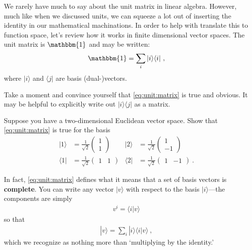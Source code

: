 We rarely have much to say about the unit matrix in linear algebra. However, much like when we discussed units, we can squeeze a lot out of inserting the identity in our mathematical machinations. In order to help with translate this to function space, let's review how it works in finite dimensional vector spaces. The unit matrix is $\mathbbm{1}$ and may be written:
\begin{align}
  \mathbbm{1} = \sum_i |i\rangle\langle i| \ ,
  \label{eq:unit:matrix}
\end{align}
where $|i\rangle$ and $\langle j|$ are basis (dual-)vectors. 
\begin{exercise}
Take a moment and convince yourself that \eqref{eq:unit:matrix} is true and obvious. It may be helpful to explicitly write out $|i\rangle \langle j|$ as a matrix. 
\end{exercise}
\begin{exercise}\label{ex:completeness:for:non:cartesian:basis}
Suppose you have a two-dimensional Euclidean vector space. Show that \eqref{eq:unit:matrix} is true for the basis
\begin{align}
  |1 \rangle &= 
  \frac{1}{\sqrt{2}}
  \begin{pmatrix}
  1 \\ 1
  \end{pmatrix}
  &
  |2 \rangle &= 
  \frac{1}{\sqrt{2}}
  \begin{pmatrix}
  1 \\ -1
  \end{pmatrix}
  \\
  \langle 1 | &= 
  \frac{1}{\sqrt{2}}
  \begin{pmatrix}
  1 & 1
  \end{pmatrix}
  &
  \langle 2 | &= 
  \frac{1}{\sqrt{2}}
  \begin{pmatrix}
  1 & -1
  \end{pmatrix} \ .
\end{align}
\end{exercise}
In fact, \eqref{eq:unit:matrix} defines what it means that a set of basis vectors is \textbf{complete}. You can write any vector $|v\rangle$ with respect to the basis $|i\rangle$---the components are simply
\begin{align}
  v^i = \langle i | v \rangle
\end{align}
so that 
\begin{align}
  |v\rangle = \sum_i |i\rangle \langle i | v \rangle \ ,
  \label{eq:summary:completeness:by:inserting:1}
\end{align}
which we recognize as nothing more than `multiplying by the identity.' 
%

